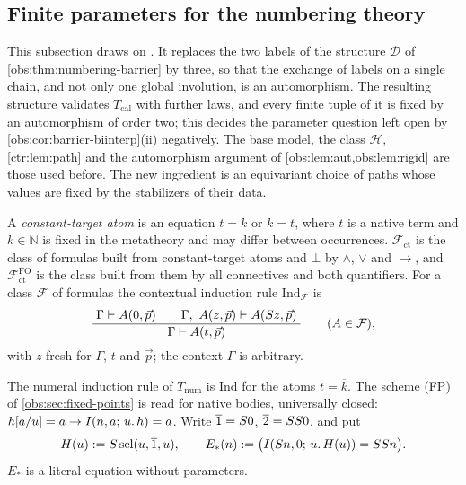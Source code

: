 \subsection{Finite parameters for the numbering theory}
\label{obs:sec:numbering-parameters}

This subsection draws on . It replaces the two labels
of the structure $\mathcal{D}$ of \cref{obs:thm:numbering-barrier} by three,
so that the exchange of labels on a single chain, and not only one global
involution, is an automorphism. The resulting structure validates
$T_{\mathrm{cal}}$ with further laws, and every finite tuple of it is fixed by
an automorphism of order two; this decides the parameter question left open
by \cref{obs:cor:barrier-biinterp}(ii) negatively. The base model, the class
$\mathscr{H}$, \cref{ctr:lem:path} and the automorphism argument of
\cref{obs:lem:aut,obs:lem:rigid} are those used before. The new ingredient is
an equivariant choice of paths whose values are fixed by the stabilizers of
their data.

\begin{definition}
\label{obs:def:constant-target}
A \emph{constant-target atom} is an equation $t=\overline{k}$ or
$\overline{k}=t$, where $t$ is a native term and $k\in\mathbb{N}$ is fixed in
the metatheory and may differ between occurrences. $\mathcal{F}_{\mathrm{ct}}$
is the class of formulas built from constant-target atoms and $\bot$ by
$\wedge$, $\vee$ and $\to$, and $\mathcal{F}^{\mathrm{FO}}_{\mathrm{ct}}$ is the
class built from them by all connectives and both quantifiers. For a class
$\mathcal{F}$ of formulas the contextual induction rule
$\mathrm{Ind}_{\mathcal{F}}$ is
\[
\dfrac{\;\Gamma\vdash A(0,\vec p)\qquad
\Gamma,\ A(z,\vec p)\vdash A(S z,\vec p)\;}{\;\Gamma\vdash A(t,\vec p)\;}\qquad(A\in\mathcal{F}),
\]
with $z$ fresh for $\Gamma$, $t$ and $\vec p$; the context $\Gamma$ is
arbitrary.
\end{definition}

The numeral induction rule of $T_{\mathrm{num}}$ is $\mathrm{Ind}$ for the atoms
$t=\overline{k}$. The scheme (FP) of \cref{obs:sec:fixed-points} is read for
native bodies, universally closed: $h[a/u]=a\to I(n,a;\,u.\,h)=a$. Write
$\overline{1}=S 0$, $\overline{2}=SS 0$, and put
\[
H(u)\mathrel{:=}S\operatorname{sel}(u,\overline{1},u),\qquad
E_{*}(n)\mathrel{:=}\bigl(I(S n,0;\,u.\,H(u))=SS n\bigr).
\]
$E_{*}$ is a literal equation without parameters.

